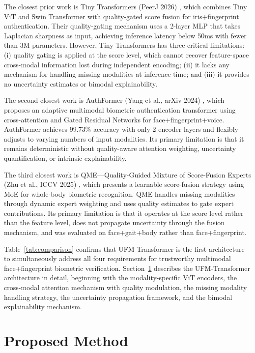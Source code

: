 \documentclass[10pt,journal,compsoc]{IEEEtran}
\begin{document}
The closest prior work is Tiny Transformers (PeerJ 2026) \cite{REF10}, which combines Tiny ViT and Swin Transformer with quality-gated score fusion for iris+fingerprint authentication. Their quality-gating mechanism uses a 2-layer MLP that takes Laplacian sharpness as input, achieving inference latency below 50ms with fewer than 3M parameters. However, Tiny Transformers has three critical limitations: (i) quality gating is applied at the score level, which cannot recover feature-space cross-modal information lost during independent encoding; (ii) it lacks any mechanism for handling missing modalities at inference time; and (iii) it provides no uncertainty estimates or bimodal explainability.

The second closest work is AuthFormer (Yang et al., arXiv 2024) \cite{REF8}, which proposes an adaptive multimodal biometric authentication transformer using cross-attention and Gated Residual Networks for face+fingerprint+voice. AuthFormer achieves 99.73\% accuracy with only 2 encoder layers and flexibly adjusts to varying numbers of input modalities. Its primary limitation is that it remains deterministic without quality-aware attention weighting, uncertainty quantification, or intrinsic explainability.

The third closest work is QME---Quality-Guided Mixture of Score-Fusion Experts (Zhu et al., ICCV 2025) \cite{REF70}, which presents a learnable score-fusion strategy using MoE for whole-body biometric recognition. QME handles missing modalities through dynamic expert weighting and uses quality estimates to gate expert contributions. Its primary limitation is that it operates at the score level rather than the feature level, does not propagate uncertainty through the fusion mechanism, and was evaluated on face+gait+body rather than face+fingerprint.

Table~\ref{tab:comparison} confirms that UFM-Transformer is the first architecture to simultaneously address all four requirements for trustworthy multimodal face+fingerprint biometric verification. Section~\ref{sec:method} describes the UFM-Transformer architecture in detail, beginning with the modality-specific ViT encoders, the cross-modal attention mechanism with quality modulation, the missing modality handling strategy, the uncertainty propagation framework, and the bimodal explainability mechanism.


\section{Proposed Method}
\label{sec:method}
\end{document}
